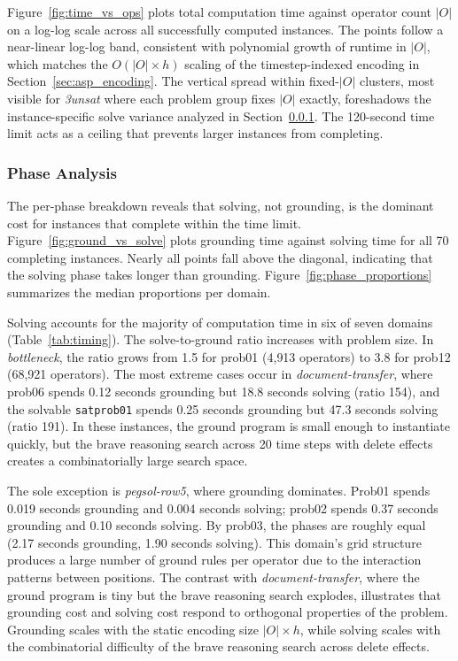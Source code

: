 Figure~\ref{fig:time_vs_ops} plots total computation time against operator count $|O|$ on a log-log scale across all successfully computed instances. The points follow a near-linear log-log band, consistent with polynomial growth of runtime in $|O|$, which matches the $O(|O| \times h)$ scaling of the timestep-indexed encoding in Section~\ref{sec:asp_encoding}. The vertical spread within fixed-$|O|$ clusters, most visible for \textit{3unsat} where each problem group fixes $|O|$ exactly, foreshadows the instance-specific solve variance analyzed in Section~\ref{sec:phase_analysis}. The 120-second time limit acts as a ceiling that prevents larger instances from completing.



\subsubsection{Phase Analysis}
\label{sec:phase_analysis}

The per-phase breakdown reveals that solving, not grounding, is the dominant cost for instances that complete within the time limit. Figure~\ref{fig:ground_vs_solve} plots grounding time against solving time for all 70 completing instances. Nearly all points fall above the diagonal, indicating that the solving phase takes longer than grounding. Figure~\ref{fig:phase_proportions} summarizes the median proportions per domain.





Solving accounts for the majority of computation time in six of seven domains (Table~\ref{tab:timing}). The solve-to-ground ratio increases with problem size. In \textit{bottleneck}, the ratio grows from 1.5 for prob01 (4{,}913 operators) to 3.8 for prob12 (68{,}921 operators). The most extreme cases occur in \textit{document-transfer}, where prob06 spends 0.12 seconds grounding but 18.8 seconds solving (ratio 154), and the solvable \texttt{satprob01} spends 0.25 seconds grounding but 47.3 seconds solving (ratio 191). In these instances, the ground program is small enough to instantiate quickly, but the brave reasoning search across 20 time steps with delete effects creates a combinatorially large search space.

The sole exception is \textit{pegsol-row5}, where grounding dominates. Prob01 spends 0.019 seconds grounding and 0.004 seconds solving; prob02 spends 0.37 seconds grounding and 0.10 seconds solving. By prob03, the phases are roughly equal (2.17 seconds grounding, 1.90 seconds solving). This domain's grid structure produces a large number of ground rules per operator due to the interaction patterns between positions. The contrast with \textit{document-transfer}, where the ground program is tiny but the brave reasoning search explodes, illustrates that grounding cost and solving cost respond to orthogonal properties of the problem. Grounding scales with the static encoding size $|O| \times h$, while solving scales with the combinatorial difficulty of the brave reasoning search across delete effects.

